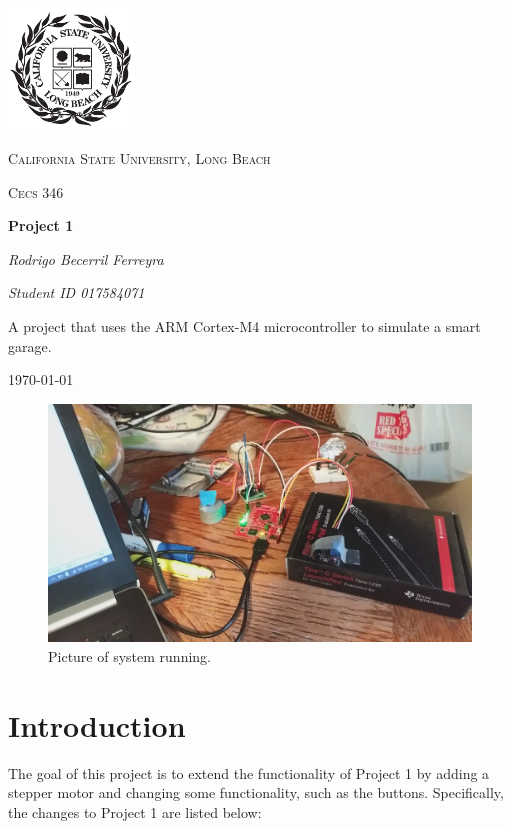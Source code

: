 \documentclass{article}
\begin{document}
\begin{titlepage}
	\centering
	\includegraphics[width=0.25\textwidth]{Images/247px-CSU-Longbeach_seal}\par\vspace{1cm}
	{\scshape\Large California State University, Long Beach \par}
	\vspace{1cm}
	{\scshape\Large Cecs 346\par}
	\vspace{1.5cm}
	{\huge\bfseries Project 1\par}
	\vspace{2cm}
    {\Large\itshape Rodrigo Becerril Ferreyra\par}
    {\itshape\Large Student ID 017584071 \par}
	\vfill
    A project that uses the ARM Cortex-M4 microcontroller to
    simulate a smart garage.

	\vfill

	{\large \today\par}
\end{titlepage}

\begin{figure}[H]
    \centering
    \includegraphics[width=\textwidth]{Images/image}
    \caption{Picture of system running.}
    \label{system}
\end{figure}

\section{Introduction} The goal of this project is to
extend the functionality of Project 1 by adding a
stepper motor and changing some functionality, such as the
buttons. Specifically, the changes to Project 1 are listed
below:
\end{document}
